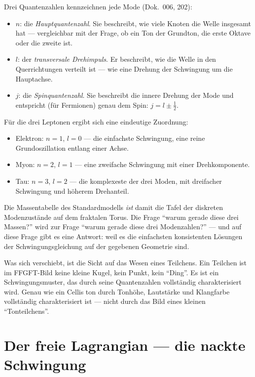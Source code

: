 Drei Quantenzahlen kennzeichnen jede Mode (Dok.~006, 202):
\begin{itemize}
  \item $n$: die \emph{Hauptquantenzahl}. Sie beschreibt, wie viele
        Knoten die Welle insgesamt hat --- vergleichbar mit der
        Frage, ob ein Ton der Grundton, die erste Oktave oder die
        zweite ist.
  \item $l$: der \emph{transversale Drehimpuls}. Er beschreibt, wie
        die Welle in den Querrichtungen verteilt ist --- wie eine
        Drehung der Schwingung um die Hauptachse.
  \item $j$: die \emph{Spinquantenzahl}. Sie beschreibt die innere
        Drehung der Mode und entspricht (für Fermionen) genau dem
        Spin: $j = l \pm \tfrac12$.
\end{itemize}

Für die drei Leptonen ergibt sich eine eindeutige Zuordnung:
\begin{itemize}
  \item Elektron: $n = 1$, $l = 0$ --- die einfachste Schwingung,
        eine reine Grundoszillation entlang einer Achse.
  \item Myon: $n = 2$, $l = 1$ --- eine zweifache Schwingung mit
        einer Drehkomponente.
  \item Tau: $n = 3$, $l = 2$ --- die komplexeste der drei Moden,
        mit dreifacher Schwingung und höherem Drehanteil.
\end{itemize}
Die Massentabelle des Standardmodells \emph{ist} damit die Tafel der
diskreten Modenzustände auf dem fraktalen Torus. Die Frage \enquote{warum
gerade diese drei Massen?} wird zur Frage \enquote{warum gerade diese
drei Modenzahlen?} --- und auf diese Frage gibt es eine Antwort: weil
es die einfachsten konsistenten Lösungen der Schwingungsgleichung
auf der gegebenen Geometrie sind.

Was sich verschiebt, ist die Sicht auf das Wesen eines Teilchens.
Ein Teilchen ist im FFGFT-Bild keine kleine Kugel, kein Punkt, kein
\enquote{Ding}. Es ist ein Schwingungsmuster, das durch seine
Quantenzahlen vollständig charakterisiert wird. Genau wie ein Cellis%
ton durch Tonhöhe, Lautstärke und Klangfarbe vollständig
charakterisiert ist --- nicht durch das Bild eines kleinen
\enquote{Tonteilchens}.

\section{Der freie Lagrangian --- die nackte Schwingung}

